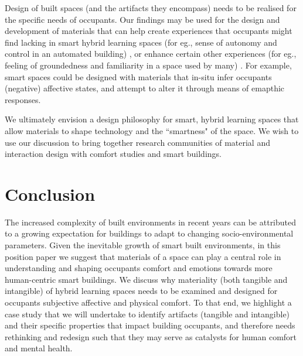 \documentclass[manuscript, anonymous, review]{acmart}
\begin{document}
Design of built spaces (and the artifacts they encompass) needs to be realised for the specific needs of occupants. Our findings may be used for the design and development of materials that can help create experiences that occupants might find lacking in smart hybrid learning spaces (for eg., sense of autonomy and control in an automated building) \cite{moreno2014user}, or enhance certain other experiences (for eg., feeling of groundedness and familiarity in a space used by many) \cite{rehman2022personalisedcomfort}.  For example, 
smart spaces could be designed with materials that in-situ infer occupants (negative) affective states, and attempt to alter it through means of emapthic responses. 

We ultimately envision a design philosophy for smart, hybrid learning spaces that allow materials to shape technology and the ``smartness" of the space. We wish to use our discussion to bring together research communities of material and interaction design with comfort studies and smart buildings.


\section{Conclusion}
The increased complexity of built environments in recent years can be attributed to a growing expectation for buildings to adapt to changing socio-environmental parameters. Given the inevitable growth of smart built environments, in this position paper we suggest that materials of a space can play a central role in understanding and shaping occupants comfort and emotions towards more human-centric smart buildings. We discuss why materiality (both tangible and intangible) of hybrid learning spaces needs to be examined and designed for occupants subjective affective and physical comfort. To that end, we highlight a case study that we will undertake to identify artifacts (tangible and intangible) and their specific properties that impact building occupants, and therefore needs rethinking and  redesign such that they may serve as catalysts for human comfort and mental health. 



\end{document}
